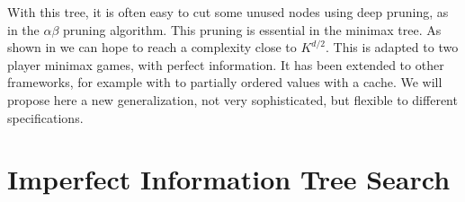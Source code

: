 \documentclass[runningheads]{llncs}
\begin{document}
With this tree, it is often easy to cut some unused nodes using deep pruning, as in the $\alpha\beta$ pruning algorithm. %
This pruning is essential in the minimax tree. As shown in \cite{knuth_analysis_1975} we can hope to reach a complexity close to $K^{d/2}$. This is adapted to two player minimax games, with perfect information. It has been extended to other frameworks, for example with \cite{ab_generalisation_2022} to partially ordered values with a cache. We will propose here a new generalization, not very sophisticated, but flexible to different specifications.




\section{Imperfect Information Tree Search}
\label{iminimax}
\end{document}
